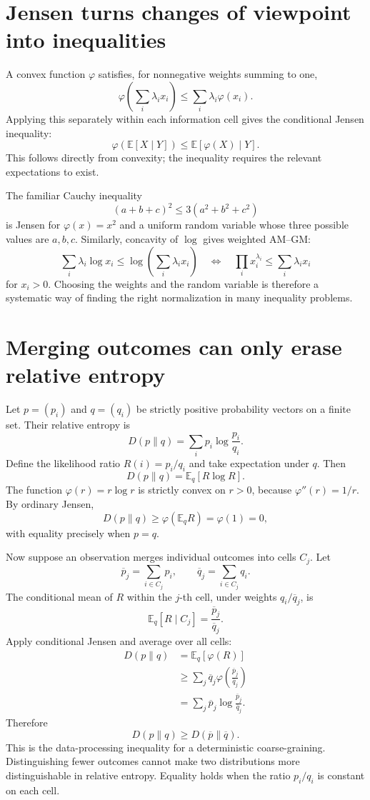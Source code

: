 \section{Jensen turns changes of viewpoint into inequalities}

A convex function \(\varphi\) satisfies, for nonnegative weights summing to one,
\[
 \varphi\left(\sum_i\lambda_ix_i\right)
 \le\sum_i\lambda_i\varphi(x_i).
\]
Applying this separately within each information cell gives the conditional Jensen inequality:
\[
 \boxed{\varphi(\mathbb E[X\mid Y])
        \le\mathbb E[\varphi(X)\mid Y].}
\]
This follows directly from convexity; the inequality requires the relevant expectations to exist.

The familiar Cauchy inequality
\[
 (a+b+c)^2\le3(a^2+b^2+c^2)
\]
is Jensen for \(\varphi(x)=x^2\) and a uniform random variable whose three possible values are \(a,b,c\). Similarly, concavity of \(\log\) gives weighted AM--GM:
\[
 \sum_i\lambda_i\log x_i
 \le\log\left(\sum_i\lambda_ix_i\right)
 \quad\Longleftrightarrow\quad
 \boxed{\prod_i x_i^{\lambda_i}\le\sum_i\lambda_ix_i}
\]
for \(x_i>0\). Choosing the weights and the random variable is therefore a systematic way of finding the right normalization in many inequality problems.

\section{Merging outcomes can only erase relative entropy}

Let \(p=(p_i)\) and \(q=(q_i)\) be strictly positive probability vectors on a finite set. Their relative entropy is
\[
 D(p\|q)=\sum_i p_i\log\frac{p_i}{q_i}.
\]
Define the likelihood ratio \(R(i)=p_i/q_i\) and take expectation under \(q\). Then
\[
 D(p\|q)=\mathbb E_q[R\log R].
\]
The function \(\varphi(r)=r\log r\) is strictly convex on \(r>0\), because \(\varphi''(r)=1/r\). By ordinary Jensen,
\[
 D(p\|q)\ge\varphi(\mathbb E_qR)=\varphi(1)=0,
\]
with equality precisely when \(p=q\).

Now suppose an observation merges individual outcomes into cells \(C_j\). Let
\[
 \overline p_j=\sum_{i\in C_j}p_i,\qquad
 \overline q_j=\sum_{i\in C_j}q_i.
\]
The conditional mean of \(R\) within the \(j\)-th cell, under weights \(q_i/\overline q_j\), is
\[
 \mathbb E_q[R\mid C_j]
 =\frac{\overline p_j}{\overline q_j}.
\]
Apply conditional Jensen and average over all cells:
\[
\begin{aligned}
 D(p\|q)
 &=\mathbb E_q[\varphi(R)]\\
 &\ge\sum_j\overline q_j
        \varphi\left(\frac{\overline p_j}{\overline q_j}\right)\\
 &=\sum_j\overline p_j
        \log\frac{\overline p_j}{\overline q_j}.
\end{aligned}
\]
Therefore
\[
 \boxed{D(p\|q)\ge D(\overline p\|\overline q).}
\]
This is the data-processing inequality for a deterministic coarse-graining. Distinguishing fewer outcomes cannot make two distributions more distinguishable in relative entropy. Equality holds when the ratio \(p_i/q_i\) is constant on each cell.

